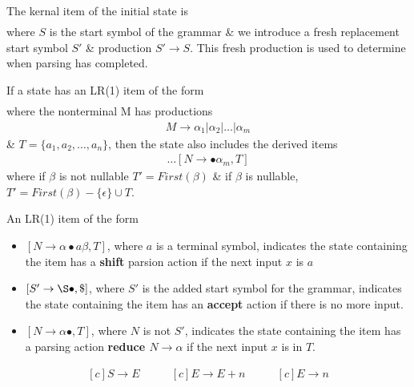 The kernal item of the initial state is
\begin{align*}
    [S' \rightarrow \bullet S, \$]
\end{align*}
where $S$ is the start symbol of the grammar \& we introduce a fresh replacement start 
symbol $S'$ \& production $S' \rightarrow S$. This fresh production is used to determine 
when parsing has completed.

If a state has an LR(1) item of the form
\begin{align*}
    [N \rightarrow \alpha \bullet M \beta, T]
\end{align*}
where the nonterminal M has productions
\begin{align*}
    M \rightarrow \alpha_1 | \alpha_2 | \dots | \alpha_m
\end{align*}
\& $T = \{a_1, a_2, \dots, a_n\}$, then the state also includes the derived items
\begin{align*}
    [N \rightarrow \bullet \alpha_1, T]
    \dots
    [N \rightarrow \bullet \alpha_m, T]
\end{align*}
where if $\beta$ is not nullable $T' = First(\beta)$ \& if $\beta$ is nullable, 
$T' = First(\beta) - \{\epsilon\} \cup T$.

An LR(1) item of the form
\begin{itemize}
    \item $[N \rightarrow \alpha \bullet a \beta, T]$, where $a$ is a terminal symbol, 
    indicates the state containing the item has a \textbf{shift} parsion action if the
    next input $x$ is $a$
    \item $[S' \rightarrow \S \bullet, \$]$, where $S'$ is the added start symbol for 
    the grammar, indicates the state containing the item has an \textbf{accept} action 
    if there is no more input.
    \item $[N \rightarrow \alpha \bullet, T]$, where $N$ is not $S'$, indicates the state 
    containing the item has a parsing action \textbf{reduce $N \rightarrow \alpha$} if 
    the next input $x$ is in $T$.
\end{itemize}

\begin{equation*}
    \begin{aligned}[c]
        S \rightarrow E
    \end{aligned}
    \qquad 
    \begin{aligned}[c]
        E \rightarrow E + n
    \end{aligned}
    \qquad 
    \begin{aligned}[c]
        E \rightarrow n
    \end{aligned}
\end{equation*}

